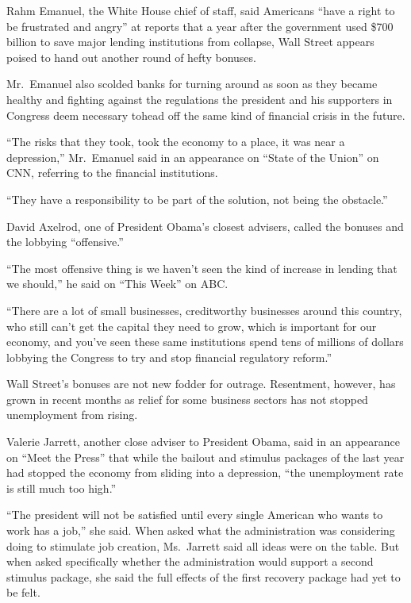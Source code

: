 ﻿\documentclass[12pt]{article}
\begin{document}
Rahm Emanuel, the White House chief of staff, said Americans ``have a right to be frustrated and
angry'' at reports that a year after the government used \$700 billion to save major lending
institutions from collapse, Wall Street appears poised to hand out another round of hefty bonuses.

Mr.~Emanuel also scolded banks for turning around as soon as they became healthy and fighting
against the regulations the president and his supporters in Congress deem necessary tohead off the
same kind of financial crisis in the future.

``The risks that they took, took the economy to a place, it was near a depression,'' Mr.~Emanuel
said in an appearance on ``State of the Union'' on CNN, referring to the financial institutions.

``They have a responsibility to be part of the solution, not being the obstacle.''

David Axelrod, one of President Obama's closest advisers, called the bonuses and the lobbying
``offensive.''

``The most offensive thing is we haven't seen the kind of increase in lending that we should,'' he
said on ``This Week'' on ABC.

``There are a lot of small businesses, creditworthy businesses around this country, who still can't
get the capital they need to grow, which is important for our economy, and you've seen these same
institutions spend tens of millions of dollars lobbying the Congress to try and stop financial
regulatory reform.''

Wall Street's bonuses are not new fodder for outrage. Resentment, however, has grown in recent
months as relief for some business sectors has not stopped unemployment from rising.

Valerie Jarrett, another close adviser to President Obama, said in an appearance on ``Meet the
Press'' that while the bailout and stimulus packages of the last year had stopped the economy from
sliding into a depression, ``the unemployment rate is still much too high.''

``The president will not be satisfied until every single American who wants to work has a job,'' she
said. When asked what the administration was considering doing to stimulate job creation,
Ms.~Jarrett said all ideas were on the table. But when asked specifically whether the administration
would support a second stimulus package, she said the full effects of the first recovery package had
yet to be felt.
\end{document}
